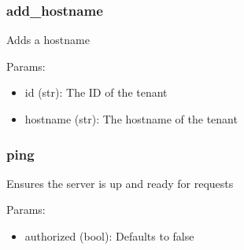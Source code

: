 \begin{Shaded}
\begin{Highlighting}[]
\NormalTok{, }\NormalTok{))}
\end{Highlighting}
\end{Shaded}

\hypertarget{add_hostname}{%
\subsubsection{add\_hostname}\label{add_hostname}}

Adds a hostname

Params:

\begin{itemize}
\tightlist
\item
  id (str): The ID of the tenant
\item
  hostname (str): The hostname of the tenant
\end{itemize}

\begin{Shaded}
\begin{Highlighting}[]
\NormalTok{c.add_hostname(tenant_data[}\NormalTok{], }\NormalTok{)}

\end{Highlighting}
\end{Shaded}

\hypertarget{ping}{%
\subsubsection{ping}\label{ping}}

Ensures the server is up and ready for requests

Params:

\begin{itemize}
\tightlist
\item
  authorized (bool): Defaults to false
\end{itemize}

\begin{Shaded}
\begin{Highlighting}[]
\OperatorTok{=}\NormalTok{) }
\end{Highlighting}
\end{Shaded}

